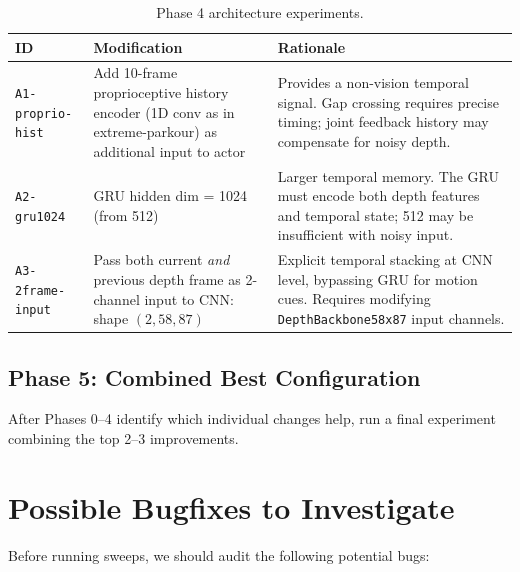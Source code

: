 \documentclass[11pt,a4paper]{article}
\begin{document}
\begin{table}[h]
\centering
\small
\begin{tabular}{p{2.5cm}p{5cm}p{5cm}}
\toprule
\textbf{ID} & \textbf{Modification} & \textbf{Rationale} \\
\midrule
\texttt{A1-proprio-hist} &
  Add 10-frame proprioceptive history encoder (1D conv as in
  extreme-parkour) as additional input to actor &
  Provides a non-vision temporal signal.  Gap crossing requires precise
  timing; joint feedback history may compensate for noisy depth. \\
\midrule
\texttt{A2-gru1024} &
  GRU hidden dim = 1024 (from 512) &
  Larger temporal memory.  The GRU must encode both depth features and
  temporal state; 512 may be insufficient with noisy input. \\
\midrule
\texttt{A3-2frame-input} &
  Pass both current \emph{and} previous depth frame as 2-channel input to
  CNN: shape $(2, 58, 87)$ &
  Explicit temporal stacking at CNN level, bypassing GRU for motion cues.
  Requires modifying \texttt{DepthBackbone58x87} input channels. \\
\bottomrule
\end{tabular}
\caption{Phase 4 architecture experiments.}
\label{tab:phase4}
\end{table}

\subsection{Phase 5: Combined Best Configuration}

After Phases 0--4 identify which individual changes help, run a final
experiment combining the top 2--3 improvements.

\section{Possible Bugfixes to Investigate}

Before running sweeps, we should audit the following potential bugs:
\end{document}
